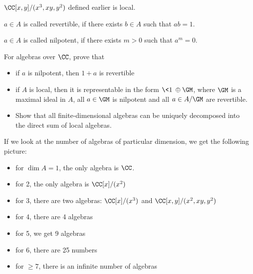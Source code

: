 \documentclass[11pt]{scrartcl}
\begin{document}
  \begin{example}

    $\CC[x, y]/ (x^{3}, xy, y^{2})$ defined earlier is local.

  \end{example}

  \begin{definition}
    $a\in A$ is called revertible, if there exists $b \in A$ such that
    $ab = 1$.
  \end{definition}

  \begin{definition}
    $a\in A$ is called nilpotent, if there exists $m > 0$ such that
    $a^{m} = 0$.
  \end{definition}

  \begin{problem*}
    \hfill

    For algebras over $\CC$, prove that
    \begin{itemize}
    \item if $a$ is nilpotent, then $1+a$ is revertible
    \item if $A$ is local, then it is representable in the form
      $\<1\> \oplus \GM$, where $\GM$ is a maximal ideal in $A$, all
      $a\in \GM$ is nilpotent and all $a\in A/ \GM$ are revertible.
    \item Show that all finite-dimensional algebras can be uniquely
      decomposed into the direct sum of local algebras.
    \end{itemize}
  \end{problem*}

  If we look at the number of algebras of particular dimension, we get
  the following picture:

  \begin{itemize}
  \item for $\dim A = 1$, the only algebra is $\CC$.
  \item for 2, the only algebra is $\CC[x]/ (x^{2})$
  \item for 3, there are two algebras: $\CC[x]/ (x^{3})$ and
    $\CC[x, y]/ (x^{2}, xy, y^{2})$
  \item for 4, there are 4 algebras
  \item for 5, we get 9 algebras
  \item for 6, there are 25 numbers
  \item for $\geq 7$, there is an infinite number of algebras
  \end{itemize}
\end{document}
